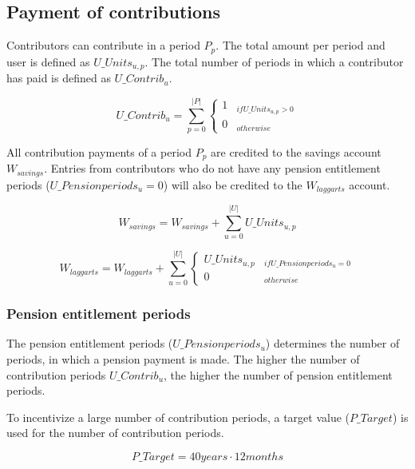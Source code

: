 \subsection{Payment of contributions}

Contributors can contribute in a period $P_{p}$. The total amount per period and user is defined as $U\_Units_{u,p}$. The total number of periods in which a contributor has paid is defined as $U\_Contrib_{u}$.

\begin{equation}
U\_Contrib_{u} = \sum_{p=0}^{|P|} \begin{cases} 
1 & _{if U\_Units_{u,p} > 0} \\
0 & _{otherwise}
\end{cases}
\end{equation}


All contribution payments of a period $P_{p}$ are credited to the savings account $W_{savings}$.
Entries from contributors who do not have any pension entitlement periods ($U\_Pensionperiods_{u} = 0$) will also be credited to the $W_{laggarts}$ account.


\begin{equation}
W_{savings} = W_{savings} + \sum_{u=0}^{|U|} U\_Units_{u,p}
\end{equation}


\begin{dmath}
W_{laggarts} = W_{laggarts} + \sum_{u=0}^{|U|} \begin{cases} 
U\_Units_{u,p} & _{if U\_Pensionperiods_{u} = 0} \\
0 & _{otherwise}
\end{cases}
\end{dmath}

\subsubsection{Pension entitlement periods}
The pension entitlement periods ($U\_Pensionperiods_{u}$) determines the number of periods, in which a pension payment is made. The higher the number of contribution periods
$U\_Contrib_{u}$, the higher the number of pension entitlement periods.

To incentivize a large number of contribution periods, a target value ($P\_Target$) is used
for the number of contribution periods. 

\begin{equation}
	P\_Target = 40 years \cdot 12 months
\end{equation}

